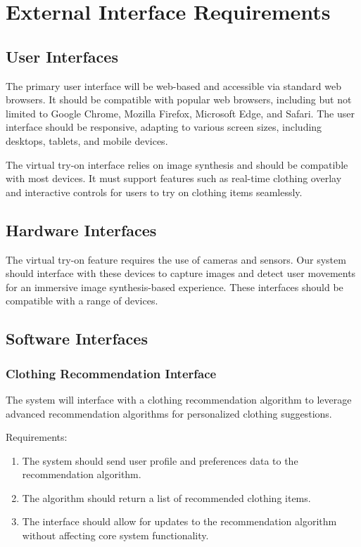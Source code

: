 \section{External Interface Requirements}
	\subsection{User Interfaces}
		The primary user interface will be web-based and accessible via standard web browsers. It should be compatible with popular web browsers, including but not limited to Google Chrome, Mozilla Firefox, Microsoft Edge, and Safari. The user interface should be responsive, adapting to various screen sizes, including desktops, tablets, and mobile devices.

		The virtual try-on interface relies on image synthesis and should be compatible with most devices. It must support features such as real-time clothing overlay and interactive controls for users to try on clothing items seamlessly.
	
	\subsection{Hardware Interfaces}
		The virtual try-on feature requires the use of cameras and sensors. Our system should interface with these devices to capture images and detect user movements for an immersive image synthesis-based experience. These interfaces should be compatible with a range of devices.

	\subsection{Software Interfaces}
		\subsubsection{Clothing Recommendation Interface}
			The system will interface with a clothing recommendation algorithm to leverage advanced recommendation algorithms for personalized clothing suggestions.

			Requirements:
			\begin{enumerate}
				\item The system should send user profile and preferences data to the recommendation algorithm.
				\item The algorithm should return a list of recommended clothing items.
				\item The interface should allow for updates to the recommendation algorithm without affecting core system functionality.
			\end{enumerate}
		
